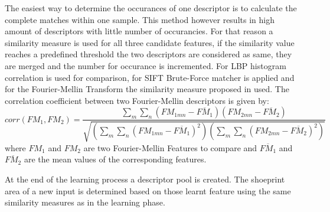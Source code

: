 \documentclass[draft,final]{vutinfth} %
\begin{document}
\par
The easiest way to determine the occurances of one descriptor is to calculate the complete matches within one sample.
This method however results in high amount of descriptors with little number of occurancies.
For that reason a similarity measure is used for all three candidate features, if the similarity value reaches a predefined threshold the two descriptors are considered as same, they are merged and the number for occurance is incremented.
For LBP histogram correlation is used for comparison, for SIFT Brute-Force matcher is applied and for the Fourier-Mellin Transform the similarity measure proposed in \cite{gueham2008automatic} used.
The correlation coefficient between two Fourier-Mellin descriptors is given by:
\[ corr(FM_{1},FM_{2}) = \frac{\sum\limits_{m}\sum\limits_{n}(FM_{1mn}-\overline{FM_{1}})(FM_{2mn}-\overline{FM_{2}})}{\sqrt{(\sum\limits_{m}\sum\limits_{n}(FM_{1mn}-\overline{FM_{1}})^2)(\sum\limits_{m}\sum\limits_{n}(FM_{2mn}-\overline{FM_{2}})^2)}}  \]
\label{FMcorr}
where $FM_{1}$ and $FM_{2}$ are two Fourier-Mellin Features to compare and $\overline{FM_{1}}$ and $\overline{FM_{2}}$ are the mean values of the corresponding features.
\par
At the end of the learning process a descriptor pool is created.
The shoeprint area of a new input is determined based on those learnt feature using the same similarity measures as in the learning phase.
\end{document}
